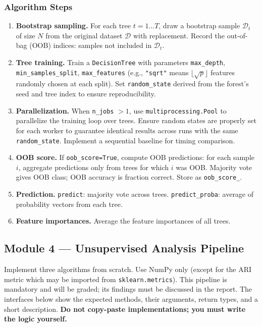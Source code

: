 \documentclass[11pt,a4paper]{article}
\begin{document}
\subsubsection{Algorithm Steps}
\begin{enumerate}[leftmargin=2.2em,label=\textbf{RF.\arabic*}]
  \item \textbf{Bootstrap sampling.} For each tree $t = 1\dots T$, draw a bootstrap sample $\mathcal{D}_t$ of size $N$ from the original dataset $\mathcal{D}$ with replacement. Record the out-of-bag (OOB) indices: samples not included in $\mathcal{D}_t$.
  \item \textbf{Tree training.} Train a \texttt{DecisionTree} with parameters \texttt{max\_depth}, \texttt{min\_samples\_split}, \texttt{max\_features} (e.g., \texttt{"sqrt"} means $\lfloor\sqrt{p}\rfloor$ features randomly chosen at each split). Set \texttt{random\_state} derived from the forest's seed and tree index to ensure reproducibility.
  \item \textbf{Parallelization.} When \texttt{n\_jobs} $> 1$, use \texttt{multiprocessing.Pool} to parallelize the training loop over trees. Ensure random states are properly set for each worker to guarantee identical results across runs with the same \texttt{random\_state}. Implement a sequential baseline for timing comparison.
  \item \textbf{OOB score.} If \texttt{oob\_score=True}, compute OOB predictions: for each sample $i$, aggregate predictions only from trees for which $i$ was OOB. Majority vote gives OOB class; OOB accuracy is fraction correct. Store as \texttt{oob\_score\_}.
  \item \textbf{Prediction.} \texttt{predict}: majority vote across trees. \texttt{predict\_proba}: average of probability vectors from each tree.
  \item \textbf{Feature importances.} Average the feature importances of all trees.
\end{enumerate}
\subsection{Module 4 --- Unsupervised Analysis Pipeline}
Implement three algorithms from scratch. Use NumPy only (except for the ARI metric which may be imported from \texttt{sklearn.metrics}). This pipeline is mandatory and will be graded; its findings must be discussed in the report. The interfaces below show the expected methods, their arguments, return types, and a short description. \textbf{Do not copy-paste implementations; you must write the logic yourself.}
\end{document}
